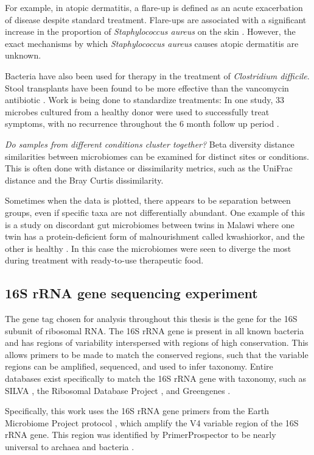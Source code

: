 For example, in atopic dermatitis, a flare-up is defined as an acute exacerbation of disease despite standard treatment. Flare-ups are associated with a significant increase in the proportion of \textit{Staphylococcus aureus} on the skin \cite{kong2012temporal}. However, the exact mechanisms by which \textit{Staphylococcus aureus} causes atopic dermatitis are unknown.

Bacteria have also been used for therapy in the treatment of \textit{Clostridium difficile}. Stool transplants have been found to be more effective than the vancomycin antibiotic \cite{van2013duodenal}. Work is being done to standardize treatments: In one study, 33 microbes cultured from a healthy donor were used to successfully treat symptoms, with no recurrence throughout the 6 month follow up period \cite{petrof2013stool}.

\textit{Do samples from different conditions cluster together?}
Beta diversity distance similarities between microbiomes can be examined for distinct sites or conditions. This is often done with distance or dissimilarity metrics, such as the UniFrac distance and the Bray Curtis dissimilarity.

Sometimes when the data is plotted, there appears to be separation between groups, even if specific taxa are not differentially abundant. One example of this is a study on discordant gut microbiomes between twins in Malawi where one twin has a protein-deficient form of malnourishment called kwashiorkor, and the other is healthy \cite{smith2013gut}. In this case the microbiomes were seen to diverge the most during treatment with ready-to-use therapeutic food.

\subsection{16S rRNA gene sequencing experiment}
The gene tag chosen for analysis throughout this thesis is the gene for the 16S subunit of ribosomal RNA. The 16S rRNA gene is present in all known bacteria and has regions of variability interspersed with regions of high conservation. This allows primers to be made to match the conserved regions, such that the variable regions can be amplified, sequenced, and used to infer taxonomy. Entire databases exist specifically to match the 16S rRNA gene with taxonomy, such as SILVA \cite{quast2013silva}, the Ribosomal Database Project \cite{cole2009ribosomal}, and Greengenes \cite{desantis2006greengenes}.

Specifically, this work uses the 16S rRNA gene primers from the Earth Microbiome Project protocol \cite{gilbert2014earth}, which amplify the V4 variable region of the 16S rRNA gene. This region was identified by PrimerProspector to be nearly universal to archaea and bacteria \cite{walters2011primerprospector}.


